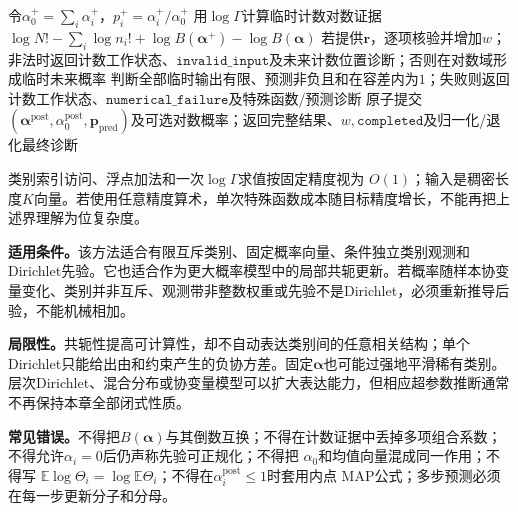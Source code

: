 \begin{AlgorithmContract}
\begin{algorithm}[H]
令$\alpha_0^+=\sum_i\alpha_i^+$，$p_i^+=\alpha_i^+/\alpha_0^+$\;
用$\log\Gamma$计算临时计数对数证据
$\log N!-\sum_i\log n_i!+\log B(\boldsymbol\alpha^+)-\log B(\boldsymbol\alpha)$\;
若提供$\boldsymbol r$，逐项核验并增加$w$；非法时返回计数工作状态、$\mathtt{invalid\_input}$及未来计数位置诊断；否则在对数域形成临时未来概率\;
判断全部临时输出有限、预测非负且和在容差内为$1$；失败则返回计数工作状态、$\mathtt{numerical\_failure}$及特殊函数/预测诊断\;
原子提交$(\boldsymbol\alpha^{\mathrm{post}},\alpha_0^{\mathrm{post}},\boldsymbol p_{\mathrm{pred}})$及可选对数概率；返回完整结果、$w,\mathtt{completed}$及归一化/退化最终诊断\;
\end{algorithm}
\end{AlgorithmContract}
\FloatBarrier
{}
\endgroup

\begin{notapplicablebox}[title=\SLComplexityAssumptionsTitle]
类别索引访问、浮点加法和一次$\log\Gamma$求值按固定精度视为
$O(1)$；输入是稠密长度$K$向量。若使用任意精度算术，单次特殊函数成本随目标精度增长，不能再把上述界理解为位复杂度。
\end{notapplicablebox}

\label{struct:V5-C05-CH28}
\textbf{适用条件。}该方法适合有限互斥类别、固定概率向量、条件独立类别观测和
Dirichlet先验。它也适合作为更大概率模型中的局部共轭更新。若概率随样本协变量变化、类别并非互斥、观测带非整数权重或先验不是Dirichlet，必须重新推导后验，不能机械相加。

\label{struct:V5-C05-CH29}
\textbf{局限性。}共轭性提高可计算性，却不自动表达类别间的任意相关结构；单个
Dirichlet只能给出由和约束产生的负协方差。固定$\boldsymbol\alpha$也可能过强地平滑稀有类别。层次Dirichlet、混合分布或协变量模型可以扩大表达能力，但相应超参数推断通常不再保持本章全部闭式性质。

\label{struct:V5-C05-CH30}
\textbf{常见错误。}不得把$B(\boldsymbol\alpha)$与其倒数互换；不得在计数证据中丢掉多项组合系数；不得允许$\alpha_i=0$后仍声称先验可正规化；不得把
$\alpha_0$和均值向量混成同一作用；不得写
$\mathbb E\log\Theta_i=\log\mathbb E\Theta_i$；不得在$\alpha_i^{\mathrm{post}}\le1$时套用内点
MAP公式；多步预测必须在每一步更新分子和分母。

